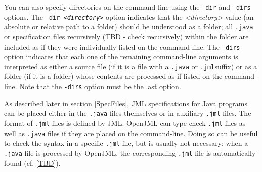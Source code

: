 You can also specify directories on the command line using the {\tt -dir} and {\tt -dirs} options.
The {\tt -dir {\it <directory>}} option indicates that the {\it <directory>} value (an absolute or
relative path to a folder) should be understood as a folder; all {\tt .java} or specification files
recursively (TBD - check recursively) within the folder are included as if they were individually listed on the command-line. The
{\tt -dirs} option indicates that each one of the remaining command-line arguments is interpreted as 
either a source file (if it is a file with a {\tt .java} or {\tt .jml}suffix) or as a folder (if it is a folder)
whose contents are processed as if listed on the command-line. Note that the {\tt -dirs} option must be
the last option.

As described later in section \ref{SpecFiles}, JML specifications for Java programs can be placed either in the 
{\tt .java} files themselves or in auxiliary {\tt .jml} files. The format
of {\tt .jml} files is defined by JML. OpenJML can type-check 
{\tt .jml} files as well as {\tt .java} files if they are placed on the 
command-line. Doing so can be useful to check the syntax in a specific
{\tt .jml} file, but is usually not necessary: when a {\tt .java} file is
processed by OpenJML, the corresponding {\tt .jml} file is automatically found (cf. \ref{TBD}).

